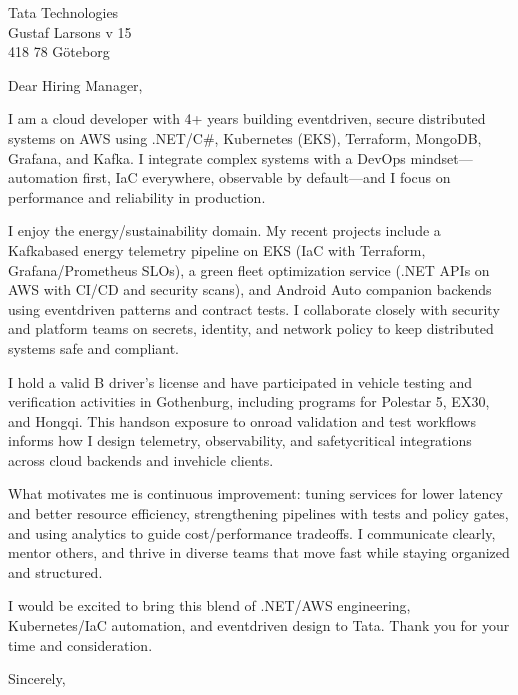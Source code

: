 \documentclass[a4paper,10pt]{letter}
\begin{document}
\pagestyle{empty}
\begin{letter}{Tata Technologies\\Gustaf Larsons v 15\\418 78 G\"{o}teborg}
\opening{Dear Hiring Manager,}

I am a cloud developer with 4+ years building event\-driven, secure distributed systems on AWS using .NET/C\#, Kubernetes (EKS), Terraform, MongoDB, Grafana, and Kafka. I integrate complex systems with a DevOps mindset—automation first, IaC everywhere, observable by default—and I focus on performance and reliability in production.

I enjoy the energy/sustainability domain. My recent projects include a Kafka\-based energy telemetry pipeline on EKS (IaC with Terraform, Grafana/Prometheus SLOs), a green fleet optimization service (.NET APIs on AWS with CI/CD and security scans), and Android Auto companion backends using event\-driven patterns and contract tests. I collaborate closely with security and platform teams on secrets, identity, and network policy to keep distributed systems safe and compliant.

I hold a valid B driver's license and have participated in vehicle testing and verification activities in Gothenburg, including programs for Polestar 5, EX30, and Hongqi. This hands\-on exposure to on\-road validation and test workflows informs how I design telemetry, observability, and safety\-critical integrations across cloud backends and in\-vehicle clients.

What motivates me is continuous improvement: tuning services for lower latency and better resource efficiency, strengthening pipelines with tests and policy gates, and using analytics to guide cost/performance trade\-offs. I communicate clearly, mentor others, and thrive in diverse teams that move fast while staying organized and structured.

I would be excited to bring this blend of .NET/AWS engineering, Kubernetes/IaC automation, and event\-driven design to Tata. Thank you for your time and consideration.

\closing{Sincerely,}
\signature{Hongzhi Li\\Ebbe Lieberathsgatan 27\\412 65 G\"{o}teborg\\hongzhili01@gmail.com\\+46 728 384 299\\2025.09.12}
\end{letter}
\end{document}
